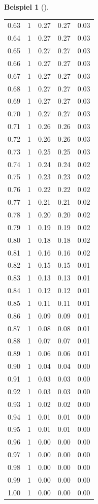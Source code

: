 \documentclass[
  ngerman,
  letterpaper,
  twoside,
  open=any]{scrbook}
\theoremstyle{definition}
\newtheorem{example}{Beispiel}[chapter]
\theoremstyle{plain}
\theoremstyle{definition}
\theoremstyle{definition}
\theoremstyle{remark}
\begin{document}
\begin{example}[]
{\begin{longtable}[]{@{}rrrrr@{}}
0.63 & 1 & 0.27 & 0.27 & 0.03 \\
0.64 & 1 & 0.27 & 0.27 & 0.03 \\
0.65 & 1 & 0.27 & 0.27 & 0.03 \\
0.66 & 1 & 0.27 & 0.27 & 0.03 \\
0.67 & 1 & 0.27 & 0.27 & 0.03 \\
0.68 & 1 & 0.27 & 0.27 & 0.03 \\
0.69 & 1 & 0.27 & 0.27 & 0.03 \\
0.70 & 1 & 0.27 & 0.27 & 0.03 \\
0.71 & 1 & 0.26 & 0.26 & 0.03 \\
0.72 & 1 & 0.26 & 0.26 & 0.03 \\
0.73 & 1 & 0.25 & 0.25 & 0.03 \\
0.74 & 1 & 0.24 & 0.24 & 0.02 \\
0.75 & 1 & 0.23 & 0.23 & 0.02 \\
0.76 & 1 & 0.22 & 0.22 & 0.02 \\
0.77 & 1 & 0.21 & 0.21 & 0.02 \\
0.78 & 1 & 0.20 & 0.20 & 0.02 \\
0.79 & 1 & 0.19 & 0.19 & 0.02 \\
0.80 & 1 & 0.18 & 0.18 & 0.02 \\
0.81 & 1 & 0.16 & 0.16 & 0.02 \\
0.82 & 1 & 0.15 & 0.15 & 0.01 \\
0.83 & 1 & 0.13 & 0.13 & 0.01 \\
0.84 & 1 & 0.12 & 0.12 & 0.01 \\
0.85 & 1 & 0.11 & 0.11 & 0.01 \\
0.86 & 1 & 0.09 & 0.09 & 0.01 \\
0.87 & 1 & 0.08 & 0.08 & 0.01 \\
0.88 & 1 & 0.07 & 0.07 & 0.01 \\
0.89 & 1 & 0.06 & 0.06 & 0.01 \\
0.90 & 1 & 0.04 & 0.04 & 0.00 \\
0.91 & 1 & 0.03 & 0.03 & 0.00 \\
0.92 & 1 & 0.03 & 0.03 & 0.00 \\
0.93 & 1 & 0.02 & 0.02 & 0.00 \\
0.94 & 1 & 0.01 & 0.01 & 0.00 \\
0.95 & 1 & 0.01 & 0.01 & 0.00 \\
0.96 & 1 & 0.00 & 0.00 & 0.00 \\
0.97 & 1 & 0.00 & 0.00 & 0.00 \\
0.98 & 1 & 0.00 & 0.00 & 0.00 \\
0.99 & 1 & 0.00 & 0.00 & 0.00 \\
1.00 & 1 & 0.00 & 0.00 & 0.00 \\


\end{longtable}}
\end{example}
\end{document}
